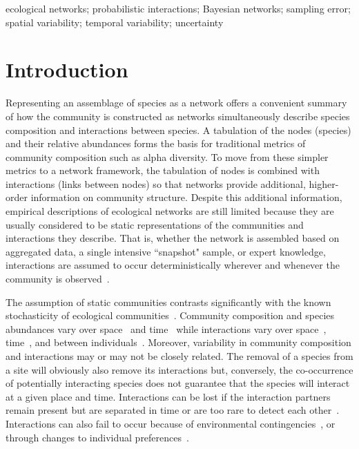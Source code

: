 \documentclass[12pt]{article}
\begin{document}
\begin{spacing}{2.0}
ecological networks; probabilistic interactions; Bayesian networks; sampling error; spatial variability; temporal variability; uncertainty

\clearpage

\section*{Introduction}

    Representing an assemblage of species as a network offers a convenient summary of how the community is constructed as networks simultaneously describe species composition and interactions between species. A tabulation of the nodes (species) and their relative abundances forms the basis for traditional metrics of community composition such as alpha diversity. To move from these simpler metrics to a network framework, the tabulation of nodes is combined with interactions (links between nodes) so that networks provide additional, higher-order information on community structure. Despite this additional information, empirical descriptions of ecological networks are still limited because they are usually considered to be static representations of the communities and interactions they describe. That is, whether the network is assembled based on aggregated data, a single intensive ``snapshot" sample, or expert knowledge, interactions are assumed to occur deterministically wherever and whenever the community is observed~\citep{Olesen2011a}. 


    The assumption of static communities contrasts significantly with the known stochasticity of ecological communities~\citep{Gotelli2000}. Community composition and species abundances vary over space~\citep{Baiser2012} and time~\citep{Olesen2011a} while interactions vary over space~\citep{Kitching1987,Baiser2012}, time~\citep{Kitching1987,Olesen2011a}, and between individuals~\citep{Pires2011a,Fodrie2015,Novak2015}. Moreover, variability in community composition and interactions may or may not be closely related. The removal of a species from a site will obviously also remove its interactions but, conversely, the co-occurrence of potentially interacting species does not guarantee that the species will interact at a given place and time. Interactions can be lost if the interaction partners remain present but are separated in time or are too rare to detect each other~\citep{Tylianakis2010}. Interactions can also fail to occur because of environmental contingencies~\citep{Poisot2015}, or through changes to individual preferences~\citep{Fodrie2015}. 



\end{spacing}
\end{document}
